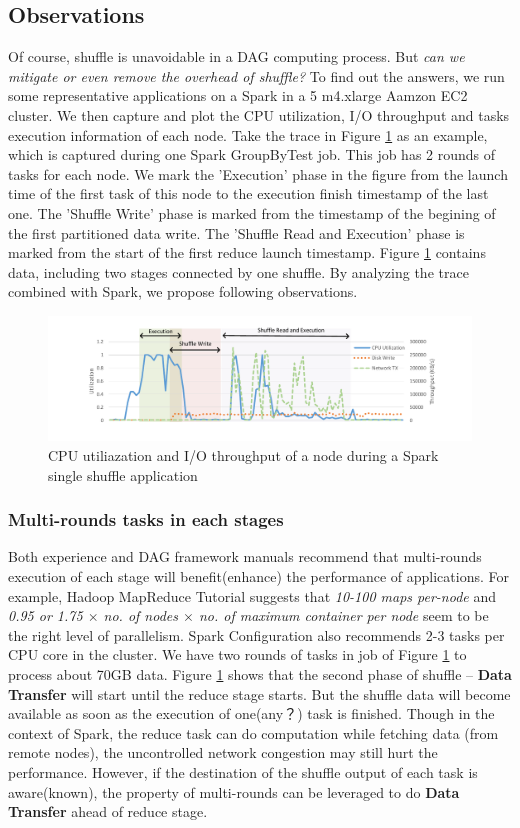 \subsection{Observations} \label{observation}
Of course, shuffle is unavoidable in a DAG computing process. But \textit{can we mitigate or even remove the overhead of shuffle?} To find out the answers, we run some representative applications on a Spark in a 5 m4.xlarge Aamzon EC2 cluster. We then capture and plot the CPU utilization, I/O throughput and tasks execution information of each node. Take the trace in Figure \ref{fig:util} as an example, which is captured during one Spark GroupByTest job. This job has 2 rounds of tasks for each node. We mark the 'Execution' phase in the figure from the launch time of the first task of this node to the execution finish timestamp of the last one. The 'Shuffle Write' phase is marked from the timestamp of the begining of the first partitioned data write. The 'Shuffle Read and Execution' phase is marked from the start of the first reduce launch timestamp.
Figure \ref{fig:util} contains data, including two stages connected by one shuffle. By analyzing the trace combined with Spark, we propose following observations.  
\begin{figure}
	\includegraphics[width=\textwidth]{fig/util}
	\caption{CPU utiliazation and I/O throughput of a node during a Spark single shuffle application}
	\label{fig:util}
\end{figure}

\subsubsection{Multi-rounds tasks in each stages}\label{multi}
Both experience and DAG framework manuals recommend that multi-rounds execution of each stage will benefit(enhance) the performance of applications.
For example, Hadoop MapReduce Tutorial \cite{hadooptutorial} suggests that \textit{10-100 maps per-node} and \textit{0.95 or 1.75 $\times$ no. of nodes $\times$ no. of maximum container per node} seem to be the right level of parallelism. Spark Configuration also recommends 2-3 tasks per CPU core in the cluster\cite{sparkconf}.
We have two rounds of tasks in job of Figure \ref{fig:util} to process about 70GB data. Figure \ref{fig:util} shows that the second phase of shuffle -- \textbf{Data Transfer} will start until the reduce stage starts.
But the shuffle data will become available as soon as the execution of one(any？) task is finished. Though in the context of Spark, the reduce task can do computation while fetching data (from remote nodes), the uncontrolled network congestion may still hurt the performance. However, if the destination of the shuffle output of each task is aware(known), the property of multi-rounds can be leveraged to do \textbf{Data Transfer} ahead of reduce stage.

